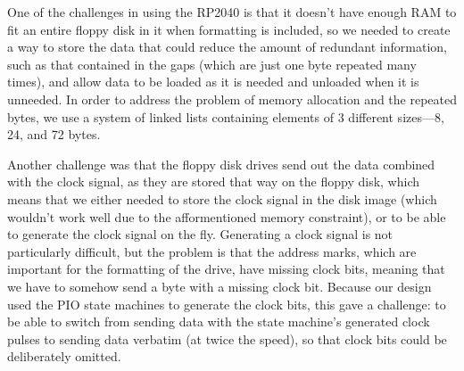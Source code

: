 \documentclass[a4paper]{article}
\begin{document}
One of the challenges in using the RP2040 is that it doesn't have
enough RAM to fit an entire floppy disk in it when formatting is
included, so we needed to create a way to store the data that could
reduce the amount of redundant information, such as that contained in
the gaps (which are just one byte repeated many times), and allow
data to be loaded as it is needed and unloaded when it is unneeded. In
order to address the problem of memory allocation and the repeated
bytes, we use a system of linked lists containing elements of 3
different sizes---8, 24, and 72 bytes.

Another challenge was that the floppy disk drives send out the data
combined with the clock signal, as they are stored that way on the
floppy disk, which means that we either needed to store the clock
signal in the disk image (which wouldn't work well due to the
afformentioned memory constraint), or to be able to generate the clock
signal on the fly. Generating a clock signal is not particularly
difficult, but the problem is that the address marks, which are
important for the formatting of the drive, have missing clock bits,
meaning that we have to somehow send a byte with a missing clock
bit. Because our design used the PIO state machines to generate the
clock bits, this gave a challenge: to be able to switch from sending
data with the state machine's generated clock pulses to sending data
verbatim (at twice the speed), so that clock bits could be
deliberately omitted.
\end{document}
